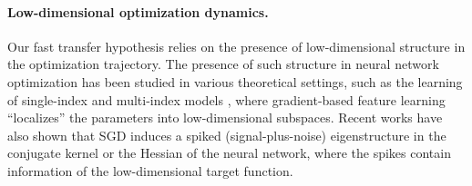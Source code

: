\paragraph{Low-dimensional optimization dynamics.}
Our fast transfer hypothesis relies on the presence of low-dimensional structure in the optimization trajectory. The presence of such structure in neural network optimization has been studied in various theoretical settings, such as the learning of single-index and multi-index models \cite{abbe2022merged,damian2022neural,bietti2023learning,mousavi2023neural,ba2023learning,berthier2024learning,mahankali2024beyond,dandi2024benefits,lee2024neural}, where gradient-based feature learning ``localizes'' the parameters into low-dimensional subspaces.
Recent works have also shown that SGD induces a spiked (signal-plus-noise) eigenstructure in the conjugate kernel \cite{ba2022high,moniri2023theory,wang2024nonlinear,dandi2024random} or the Hessian \cite{arous2023high,arous2025local} of the neural network, where the spikes contain information of the low-dimensional target function. 